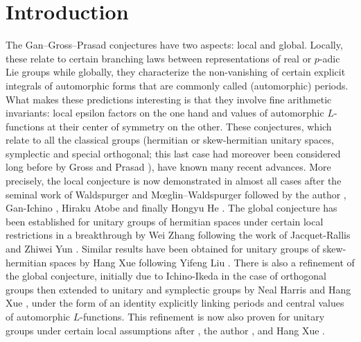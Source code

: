 \section*{Introduction}


The Gan--Gross--Prasad \cite{gan2011symplectic} conjectures have two aspects: local and global.
Locally, these relate to certain branching laws between representations of real or $p$-adic Lie groups while globally, they characterize the non-vanishing of certain explicit integrals of automorphic forms that are commonly called (automorphic) periods.
What makes these predictions interesting is that they involve fine arithmetic invariants: local epsilon factors on the one hand and values of automorphic $L$-functions at their center of symmetry on the other.
These conjectures, which relate to all the classical groups (hermitian or skew-hermitian unitary spaces, symplectic and special orthogonal; this last case had moreover been considered long before by Gross and Prasad \cite{gross1992decomposition,gross1994irreducible}), have known many recent advances.
More precisely, the local conjecture is now demonstrated in almost all cases after the seminal work of Waldspurger \cite{waldspurger2010formule,waldspurger2012calcul,waldspurger2012conjecture,waldspurger2012formule} and Mœglin--Waldspurger \cite{moeglin2012conjecture} followed by the author \cite{beuzart2014expression,beuzart2015endoscopie,beuzart2016conjecture,beuzart2015local}, Gan-Ichino \cite{gan2016gross}, Hiraku Atobe \cite{atobe2018local} and finally Hongyu He \cite{he2017gan}.
The global conjecture has been established for unitary groups of hermitian spaces under certain local restrictions in a breakthrough by Wei Zhang \cite{zhang2014fourier} following the work of Jacquet-Rallis \cite{jacquet2011gross} and Zhiwei Yun \cite{yun2011fundamental}.
Similar results have been obtained for unitary groups of skew-hermitian spaces by Hang Xue \cite{xue2014gan} following Yifeng Liu \cite{liu2014relative}.
There is also a refinement of the global conjecture, initially due to Ichino-Ikeda \cite{ichino2010periods} in the case of orthogonal groups then extended to unitary and symplectic groups by Neal Harris \cite{harris2014refined} and Hang Xue \cite{xue2016fourier,xue2017refined}, under the form of an identity explicitly linking periods and central values of automorphic $L$-functions.
This refinement is now also proven for unitary groups under certain local assumptions after \cite{zhang2014automorphic}, the author \cite{beuzart2021comparison}, and Hang Xue \cite{xue2016fourier,xue2017fourier}.

